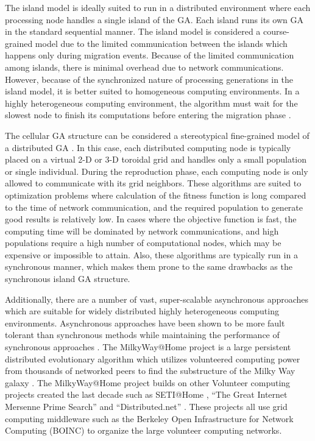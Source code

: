     The island model is ideally suited to run in a distributed environment where
      each processing node handles a single island of the GA. 
    Each island runs its own GA in the standard sequential manner. 
    The island model is considered a course-grained model \cite{Cantu-Paz1998}
      due to the limited communication between the islands which happens only
      during migration events. 
    Because of the limited communication among islands, there is minimal
      overhead due to network communications. 
    However, because of the synchronized nature of processing generations in
      the island model, it is better suited to homogeneous computing
      environments. 
    In a highly heterogeneous computing environment, the algorithm must wait
      for the slowest node to finish its computations before entering the
      migration phase \cite{Desell2010}.

    The cellular GA structure can be considered a stereotypical fine-grained
      model of a distributed GA \cite{Cantu-Paz1998, Schoneveld1996}. 
    In this case, each distributed computing node is typically placed on a
      virtual 2-D or 3-D toroidal grid and handles only a small population or
      single individual. 
    During the reproduction phase, each computing node is only allowed to
      communicate with its grid neighbors. 
    These algorithms are suited to optimization problems where calculation of
      the fitness function is long compared to the time of network communication,
      and the required population to generate good results is
      relatively low. 
    In cases where the objective function is fast, the computing time will be
      dominated by network communications, and high populations require a high
      number of computational nodes, which may be expensive or impossible to
      attain. 
    Also, these algorithms are typically run in a synchronous manner, which
      makes them prone to the same drawbacks as the synchronous island GA
      structure. 

    Additionally, there are a number of vast, super-scalable asynchronous
      approaches which are suitable for widely distributed highly heterogeneous
      computing environments. 
    Asynchronous approaches have been shown to be more fault tolerant than 
      synchronous methods while maintaining the performance of synchronous approaches
      \cite{Lewis2009}. 
    The MilkyWay@Home project is a large persistent distributed evolutionary
      algorithm which utilizes volunteered computing power from thousands of
      networked peers to find the substructure of the Milky Way galaxy
      \cite{Cole2010}. 
    The MilkyWay@Home project builds on other Volunteer computing projects
      created the last decade such as SETI@Home \cite{Anderson2002}, ``The Great
      Internet Mersenne Prime Search'' \cite{mersenne_website} and
      ``Distributed.net'' \cite{distributednet_website}. 
    These projects all use grid computing middleware such as the Berkeley Open
      Infrastructure for Network Computing (BOINC) \cite{Anderson2004} to
      organize the large volunteer computing networks. 

